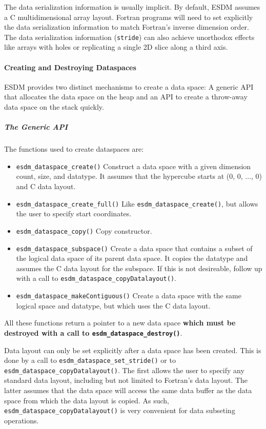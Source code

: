 The data serialization information is usually implicit.
By default, ESDM assumes a C multidimensional array layout. 
Fortran programs will need to set explicitly the data serialization information to match Fortran's inverse dimension order. 
The data serialization information (\lstinline|stride|) can also achieve unorthodox effects like arrays with holes or replicating a single 2D slice along a third axis.

\paragraph{Creating and Destroying Dataspaces}
ESDM provides two distinct mechanisms to create a data space: A generic API that allocates the data space on the heap and an API to create a throw-away data space on the stack quickly.

\subparagraph{The Generic API}
The functions used to create dataspaces are:

\begin{itemize}
  \item \lstinline|esdm_dataspace_create()|
    Construct a data space with a given dimension count, size, and datatype. 
    It assumes that the hypercube starts at (0, 0, ..., 0) and C data layout.
  \item \lstinline|esdm_dataspace_create_full()|
    Like \lstinline|esdm_dataspace_create()|, but allows the user to specify start coordinates.
  \item \lstinline|esdm_dataspace_copy()|
    Copy constructor.
  \item \lstinline|esdm_dataspace_subspace()|
    Create a data space that contains a subset of the logical data space of its parent data space. 
    It copies the datatype and assumes the C data layout for the subspace. 
    If this is not desireable, follow up with a call to \lstinline|esdm_dataspace_copyDatalayout()|.
  \item \lstinline|esdm_dataspace_makeContiguous()|
    Create a data space with the same logical space and datatype, but which uses the C data layout.
\end{itemize}

All these functions return a pointer to a new data space \textbf{which must be destroyed with a call to \lstinline|esdm_dataspace_destroy()|}.

Data layout can only be set explicitly after a data space has been created. 
This is done by a call to \lstinline|esdm_dataspace_set_stride()| or to \lstinline|esdm_dataspace_copyDatalayout()|. 
The first allows the user to specify any standard data layout, including but not limited to Fortran's data layout. 
The latter assumes that the data space will access the same data buffer as the data space from which the data layout is copied. 
As such, \lstinline|esdm_dataspace_copyDatalayout()| is very convenient for data subseting operations.

